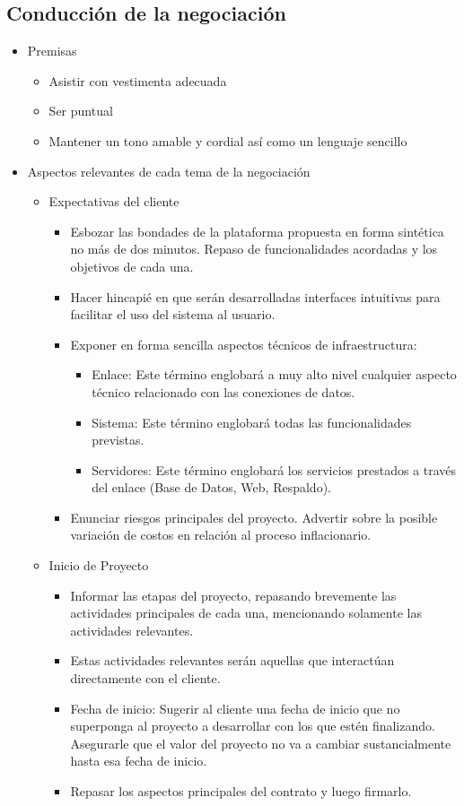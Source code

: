 \subsection{Conducción de la negociación}
\begin{itemize}
	\item Premisas
		\begin{itemize}
			\item Asistir con vestimenta adecuada
			\item Ser puntual
			\item Mantener un tono amable y cordial así como un lenguaje sencillo
		\end{itemize}
    
	\item Aspectos relevantes de cada tema de la negociación
    \begin{itemize}
		\item Expectativas del cliente
		\begin{itemize} 
			\item Esbozar las bondades de la plataforma propuesta en forma sintética no más de dos minutos. Repaso de funcionalidades acordadas y los objetivos de cada una.
			\item Hacer hincapié en que serán desarrolladas interfaces intuitivas para facilitar el uso del sistema al usuario.
			\item Exponer en forma sencilla aspectos técnicos de infraestructura:
			\begin{itemize}
				\item Enlace: Este término englobará a muy alto nivel cualquier aspecto técnico relacionado con las conexiones de datos.
				\item Sistema: Este término englobará todas las funcionalidades previstas.
				\item Servidores: Este término englobará los servicios prestados a través del enlace (Base de Datos, Web, Respaldo).
			\end{itemize}
            \item Enunciar riesgos principales del proyecto. Advertir sobre la posible variación de costos en relación al proceso inflacionario.
		\end{itemize}
        
		\item Inicio de Proyecto
        
	    \begin{itemize}
			\item Informar las etapas del proyecto, repasando brevemente las actividades principales de cada una, mencionando solamente las actividades relevantes.
			\item Estas actividades relevantes serán aquellas que interactúan directamente con el cliente.
			\item Fecha de inicio: Sugerir al cliente una fecha de inicio que no superponga al proyecto a desarrollar con los que estén finalizando. Asegurarle que el valor del proyecto no va a cambiar sustancialmente hasta esa fecha de inicio.
			\item Repasar los aspectos principales del contrato y luego firmarlo.
        \end{itemize}
        

\end{itemize}
\end{itemize}

